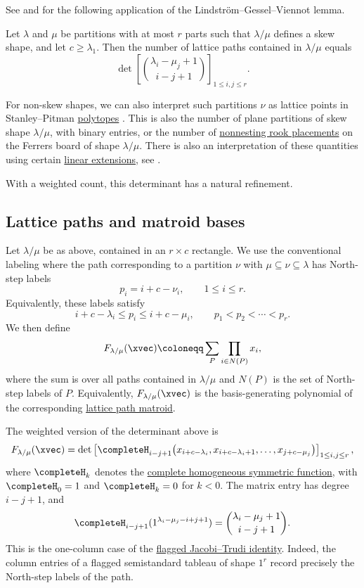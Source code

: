 See \cite[Thm.~10.7.1]{Krattenthaler2015} and
\cite[Eq.~(6)]{StanleyPitman2002} for the following application of the
Lindström--Gessel--Viennot lemma.

\begin{theorem}
Let $\lambda$ and $\mu$ be partitions with at most $r$ parts such that
$\lambda/\mu$ defines a skew shape, and let $c \geq \lambda_1$.
Then the number of lattice paths contained in $\lambda / \mu$ equals
\[
  \det \left[ \binom{\lambda_i - \mu_j+1}{i-j+1} \right]_{1\leq i,j \leq r}.
\]
\end{theorem}
For non-skew shapes, we can also interpret such partitions $\nu$ as lattice
points in Stanley--Pitman \hyperref[polytope]{polytopes} \cite{StanleyPitman2002}.
This is also the number of plane partitions of skew shape $\lambda/\mu$, with binary entries,
or the number of \hyperref[nonNestingRookPlacement]{nonnesting rook placements}
on the Ferrers board of shape $\lambda / \mu$.
There is also an interpretation of these quantities using certain
\hyperref[linearExtension]{linear extensions}, see
\cite{AlexanderssonJal2024x}.

With a weighted count, this determinant has a natural refinement.

\subsection[LGVLatticePathsInSkewShape]{Lattice paths and matroid bases}

Let $\lambda/\mu$ be as above, contained in an $r \times c$ rectangle.
We use the conventional labeling where the path corresponding to a partition
$\nu$ with $\mu \subseteq \nu \subseteq \lambda$ has North-step labels
\[
  p_i = i+c-\nu_i,\qquad 1 \leq i \leq r.
\]
Equivalently, these labels satisfy
\[
  i+c-\lambda_i \leq p_i \leq i+c-\mu_i,\qquad
  p_1 \lt p_2 \lt \dotsb \lt p_r.
\]
We then define
\[
  F_{\lambda/\mu}(\xvec) \coloneqq \sum_{P} \prod_{i \in N(P)} x_i,
\]
where the sum is over all paths contained in $\lambda/\mu$ and $N(P)$ is the
set of North-step labels of $P$.
Equivalently, $F_{\lambda/\mu}(\xvec)$ is the basis-generating polynomial of
the corresponding \hyperref[latticePathMatroidDefinition]{lattice path matroid}.

The weighted version of the determinant above is
\[
  F_{\lambda/\mu}(\xvec)
  =
  \det\left[
    \completeH_{i-j+1}
    \bigl(x_{i+c-\lambda_i},x_{i+c-\lambda_i+1},\dotsc,x_{j+c-\mu_j}\bigr)
  \right]_{1\leq i,j \leq r},
\]
where $\completeH_k$ denotes the
\hyperref[completeH]{complete homogeneous symmetric function}, with
$\completeH_0=1$ and $\completeH_k=0$ for $k \lt 0$.
The matrix entry has degree $i-j+1$, and
\[
  \completeH_{i-j+1}(1^{\lambda_i-\mu_j-i+j+1})
  =
  \binom{\lambda_i-\mu_j+1}{i-j+1}.
\]
This is the one-column case of the
\hyperref[flaggedSchurPolynomialJacobiTrudi]{flagged Jacobi--Trudi identity}.
Indeed, the column entries of a flagged semistandard tableau of shape $1^r$
record precisely the North-step labels of the path.

